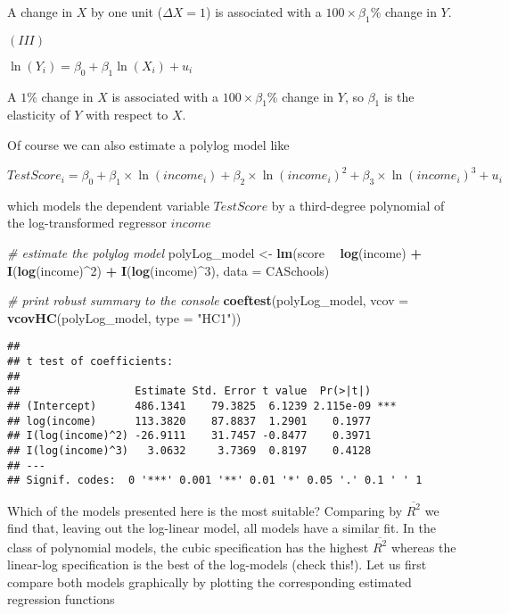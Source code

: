 \documentclass[]{book}
\newenvironment{Shaded}{\begin{snugshade}}{\end{snugshade}}
\newcommand{\KeywordTok}[1]{\textcolor[rgb]{0.13,0.29,0.53}{\textbf{#1}}}
\newcommand{\DataTypeTok}[1]{\textcolor[rgb]{0.13,0.29,0.53}{#1}}
\newcommand{\DecValTok}[1]{\textcolor[rgb]{0.00,0.00,0.81}{#1}}
\newcommand{\StringTok}[1]{\textcolor[rgb]{0.31,0.60,0.02}{#1}}
\newcommand{\CommentTok}[1]{\textcolor[rgb]{0.56,0.35,0.01}{\textit{#1}}}
\newcommand{\OperatorTok}[1]{\textcolor[rgb]{0.81,0.36,0.00}{\textbf{#1}}}
\newcommand{\NormalTok}[1]{#1}
\theoremstyle{definition}
\theoremstyle{definition}
\theoremstyle{definition}
\theoremstyle{remark}
\begin{document}
A change in \(X\) by one unit (\(\Delta X = 1\)) is associated with a
\(100 \times \beta_1 \%\) change in \(Y\).

\((III)\)

\(\ln(Y_i) = \beta_0 + \beta_1 \ln(X_i) + u_i\)

A \(1 \%\) change in \(X\) is associated with a
\(100 \times \beta_1 \%\) change in \(Y\), so \(\beta_1\) is the
elasticity of \(Y\) with respect to \(X\).

Of course we can also estimate a polylog model like

\[ TestScore_i = \beta_0 + \beta_1 \times \ln(income_i) + \beta_2 \times \ln(income_i)^2 + \beta_3 \times \ln(income_i)^3 + u_i \]

which models the dependent variable \(TestScore\) by a third-degree
polynomial of the log-transformed regressor \(income\)

\begin{Shaded}
\begin{Highlighting}[]
\CommentTok{# estimate the polylog model}
\NormalTok{polyLog_model <-}\StringTok{ }\KeywordTok{lm}\NormalTok{(score }\OperatorTok{~}\StringTok{ }\KeywordTok{log}\NormalTok{(income) }\OperatorTok{+}\StringTok{ }\KeywordTok{I}\NormalTok{(}\KeywordTok{log}\NormalTok{(income)}\OperatorTok{^}\DecValTok{2}\NormalTok{) }\OperatorTok{+}\StringTok{ }\KeywordTok{I}\NormalTok{(}\KeywordTok{log}\NormalTok{(income)}\OperatorTok{^}\DecValTok{3}\NormalTok{), }
                    \DataTypeTok{data =}\NormalTok{ CASchools)}

\CommentTok{# print robust summary to the console}
\KeywordTok{coeftest}\NormalTok{(polyLog_model, }
         \DataTypeTok{vcov =} \KeywordTok{vcovHC}\NormalTok{(polyLog_model, }\DataTypeTok{type =} \StringTok{"HC1"}\NormalTok{))}
\end{Highlighting}
\end{Shaded}

\begin{verbatim}
## 
## t test of coefficients:
## 
##                  Estimate Std. Error t value  Pr(>|t|)    
## (Intercept)      486.1341    79.3825  6.1239 2.115e-09 ***
## log(income)      113.3820    87.8837  1.2901    0.1977    
## I(log(income)^2) -26.9111    31.7457 -0.8477    0.3971    
## I(log(income)^3)   3.0632     3.7369  0.8197    0.4128    
## ---
## Signif. codes:  0 '***' 0.001 '**' 0.01 '*' 0.05 '.' 0.1 ' ' 1
\end{verbatim}

Which of the models presented here is the most suitable? Comparing by
\(\overline{R^2}\) we find that, leaving out the log-linear model, all
models have a similar fit. In the class of polynomial models, the cubic
specification has the highest \(\overline{R^2}\) whereas the linear-log
specification is the best of the log-models (check this!). Let us first
compare both models graphically by plotting the corresponding estimated
regression functions
\end{document}
